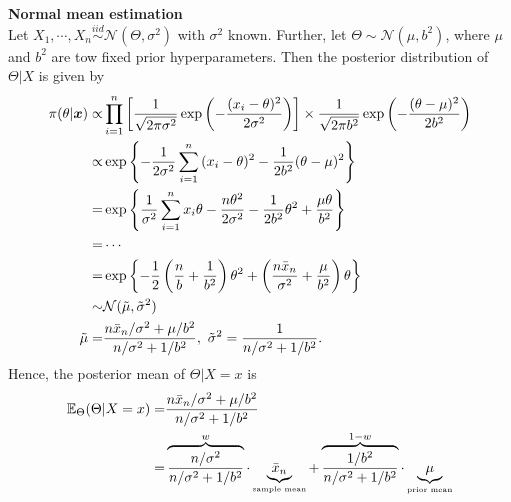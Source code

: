 \begin{example}
    \textbf{Normal mean estimation}\\
    Let $X_1,\cdots,X_n\overset{iid}{\sim}\mathcal{N}(\Theta,\sigma^2)$ with $\sigma^2$ known.
    Further, let $\Theta\sim \mathcal{N}(\mu,b^2)$,
    where $\mu$ and $b^2$ are tow fixed prior hyperparameters.
    Then the posterior distribution of $\Theta|X$ is given by 
    \begin{align}
        \pi(\theta|\boldsymbol{x})
        \propto& \prod_{i=1}^n\left[
            \frac{1}{\sqrt{2\pi\sigma^2}}\exp\left(
                -\frac{(x_i-\theta)^2}{2\sigma^2}
            \right)
        \right]
        \times\frac{1}{\sqrt{2\pi b^2}}\exp\left(
            -\frac{(\theta-\mu)^2}{2b^2}
        \right)\\
        \propto& \exp\left\{
            -\frac{1}{2\sigma^2}\sum_{i=1}^n{(x_i-\theta)^2}
            -\frac{1}{2b^2}(\theta-\mu)^2
        \right\}\\
        =& \exp\left\{
            \frac{1}{\sigma^2}\sum_{i=1}^n{x_i\theta}
            -\frac{n\theta^2}{2\sigma^2}
            -\frac{1}{2b^2}\theta^2
            +\frac{\mu\theta}{b^2}
        \right\}\\
        =& \cdots\\
        =& \exp\left\{
            -\frac{1}{2}\left(
                \frac{n}{b}+\frac{1}{b^2}
            \right)\theta^2
            + \left(
                \frac{n\Bar{x}_n}{\sigma^2}+\frac{\mu}{b^2}
            \right)\theta
        \right\}\\
        \sim& \mathcal{N}(\Tilde{\mu},\Tilde{\sigma}^2)\\
        \Tilde{\mu}=&\frac{n\Bar{x}_n/\sigma^2+\mu/b^2}{n/\sigma^2+1/b^2},~
        \Tilde{\sigma}^2=\frac{1}{n/\sigma^2+1/b^2}.
    \end{align}
    Hence, the posterior mean of $\Theta|X=x$ is 
    \begin{align}
        \mathbb{E}_\Theta(\Theta|X=x)
        =&\frac{n\Bar{x}_n/\sigma^2+\mu/b^2}{n/\sigma^2+1/b^2}\\
        =&\overbrace{\frac{n/\sigma^2}{n/\sigma^2+1/b^2}}^{w}\cdot\underbrace{\Bar{x}_n}_{\text{\tiny sample mean}}
        +\overbrace{\frac{1/b^2}{n/\sigma^2+1/b^2}}^{1-w}\cdot\underbrace{\mu}_{\text{\tiny prior mean}}
    \end{align}
\end{example}

